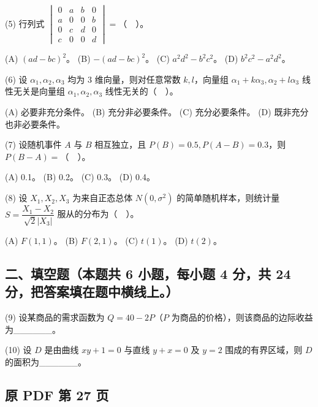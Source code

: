 \documentclass[UTF8,12pt]{ctexart}
\begin{document}
(5) 行列式 \(\displaystyle \begin{vmatrix}0&a&b&0\\a&0&0&b\\0&c&d&0\\c&0&0&d\end{vmatrix}=\)（　）。


(A) \(\displaystyle (ad-bc)^2\)。 (B) \(\displaystyle -(ad-bc)^2\)。 (C) \(\displaystyle a^2d^2-b^2c^2\)。 (D) \(\displaystyle b^2c^2-a^2d^2\)。


(6) 设 \(\displaystyle \alpha_1,\allowbreak \alpha_2,\allowbreak \alpha_3\) 均为 3 维向量，则对任意常数 \(\displaystyle k,\allowbreak l\)，向量组 \(\displaystyle \alpha_1+k\alpha_3,\allowbreak \alpha_2+l\alpha_3\) 线性无关是向量组 \(\displaystyle \alpha_1,\allowbreak \alpha_2,\allowbreak \alpha_3\) 线性无关的（　）。


(A) 必要非充分条件。 (B) 充分非必要条件。 (C) 充分必要条件。 (D) 既非充分也非必要条件。


(7) 设随机事件 \(\displaystyle A\) 与 \(\displaystyle B\) 相互独立，且 \(\displaystyle P(B)=0.5,\allowbreak P(A-B)=0.3\)，则 \(\displaystyle P(B-A)=\)（　）。


(A) 0.1。 (B) 0.2。 (C) 0.3。 (D) 0.4。


(8) 设 \(\displaystyle X_1,\allowbreak X_2,\allowbreak X_3\) 为来自正态总体 \(\displaystyle N(0,\allowbreak \sigma^2)\) 的简单随机样本，则统计量 \(\displaystyle S=\dfrac{\displaystyle X_1-X_2}{\displaystyle \sqrt2|X_3|}\) 服从的分布为（　）。


(A) \(\displaystyle F(1,\allowbreak 1)\)。 (B) \(\displaystyle F(2,\allowbreak 1)\)。 (C) \(\displaystyle t(1)\)。 (D) \(\displaystyle t(2)\)。


\subsection*{二、填空题（本题共 6 小题，每小题 4 分，共 24 分，把答案填在题中横线上。）}

(9) 设某商品的需求函数为 \(\displaystyle Q=40-2P\)（\(\displaystyle P\) 为商品的价格），则该商品的边际收益为\_\_\_\_\_\_。


(10) 设 \(\displaystyle D\) 是由曲线 \(\displaystyle xy+1=0\) 与直线 \(\displaystyle y+x=0\) 及 \(\displaystyle y=2\) 围成的有界区域，则 \(\displaystyle D\) 的面积为\_\_\_\_\_\_。


\clearpage

\subsection*{原 PDF 第 27 页}
\end{document}

